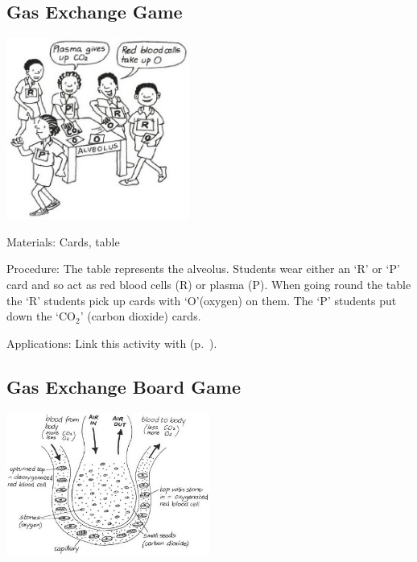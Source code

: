 \begin{multicols}{2}
\subsection{Gas Exchange Game} %

\begin{center}
\includegraphics[width=0.45\textwidth]{./img/vso/gas-exchange-students.jpg}
\end{center}

\begin{description*}
\item[Materials:]{Cards, table}
\item[Procedure:]{The table represents the alveolus.
Students wear either an `R' or `P'
card and so act as red blood cells
(R) or plasma (P). When going
round the table the `R' students
pick up cards with `O'(oxygen)
on them. The `P' students put down the
`CO$_2$' (carbon dioxide) cards.}
\item[Applications:]{Link this activity with  (p.~\pageref{sub:circulation-game}).}
\end{description*}

\columnbreak

\subsection{Gas Exchange Board Game}

\begin{center}
\includegraphics[width=0.5\textwidth]{./img/vso/gas-exchange-game.jpg}
\end{center}


\end{multicols}
